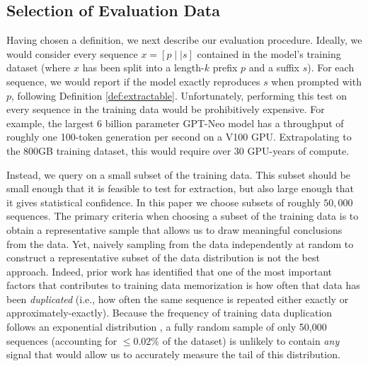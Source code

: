 \subsection{Selection of Evaluation Data}

Having chosen a definition, we next describe our evaluation procedure.
%
Ideally, we would consider every sequence $x=[p \mid \mid s]$ contained in the model's training dataset (where $x$ has been split into a length-$k$ prefix $p$ and a suffix $s$). For each sequence, we would report if the model exactly reproduces $s$ when prompted with $p$, following Definition \ref{def:extractable}.
Unfortunately, performing this test on every sequence in the training data would be prohibitively expensive.
For example, the largest 6 billion parameter GPT-Neo model has a throughput of roughly one 100-token generation per second on a V100 GPU. Extrapolating to the 800GB training dataset, this would require over $30$ GPU-years of compute.

Instead, we query on a small subset of the training data.
%
This subset should be small enough that it is feasible to test for extraction, 
but also large enough that
it gives statistical confidence.
%
In this paper we choose subsets of roughly $50{,}000$ sequences.
The primary criteria when choosing a subset of the training data is to obtain a representative sample that allows
us to draw meaningful conclusions from the data.
%
Yet, naively sampling from the data independently at random to construct a representative subset of the data distribution is not the best approach.
Indeed, prior work has identified that one of the most important factors that contributes to training data memorization is how often that data has been \emph{duplicated} (i.e., how often the same sequence is repeated either exactly or approximately-exactly).
%
Because the frequency of training data duplication follows an exponential distribution \citep{lee2021deduplicating}, a fully random sample of only 50,000 sequences
(accounting for $\le 0.02\%$ of the dataset)
is unlikely to contain \emph{any} signal that would allow us to 
accurately measure the tail of this distribution.




